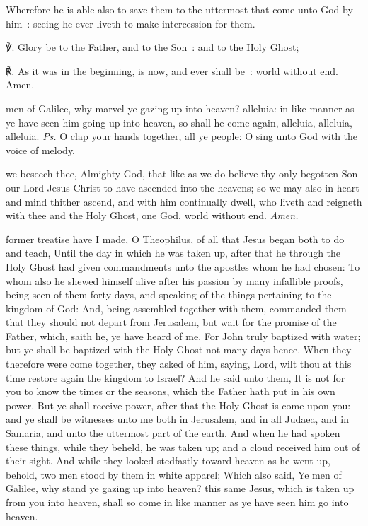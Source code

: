 Wherefore he is able also to save them to the uttermost that come unto God by him~: seeing he ever liveth to make intercession for them.


℣. Glory be to the Father, and to the Son~: and to the Holy Ghost;\par
℟. As it was in the beginning, is now, and ever shall be~: world without end. Amen.


\introit
{} men of Galilee, why marvel ye gazing up into heaven? alleluia: in like manner as ye have seen him going up into heaven, so shall he come again, alleluia, alleluia, alleluia. \textit{Ps.} O clap your hands together, all ye people: O sing unto God with the voice of melody,

\collect\label{AscensionCollect}
 we beseech thee, Almighty God, that like as we do believe thy only-begotten Son our Lord Jesus Christ to have ascended into the heavens; so we may also in heart and mind thither ascend, and with him continually dwell, who liveth and reigneth with thee and the Holy Ghost, one God, world without end. \textit{Amen.}

 former treatise have I made, O Theophilus, of all that Jesus began both to do and teach, Until the day in which he was taken up, after that he through the Holy Ghost had given commandments unto the apostles whom he had chosen: To whom also he shewed himself alive after his passion by many infallible proofs, being seen of them forty days, and speaking of the things pertaining to the kingdom of God: And, being assembled together with them, commanded them that they should not depart from Jerusalem, but wait for the promise of the Father, which, saith he, ye have heard of me. For John truly baptized with water; but ye shall be baptized with the Holy Ghost not many days hence. When they therefore were come together, they asked of him, saying, Lord, wilt thou at this time restore again the kingdom to Israel? And he said unto them, It is not for you to know the times or the seasons, which the Father hath put in his own power. But ye shall receive power, after that the Holy Ghost is come upon you: and ye shall be witnesses unto me both in Jerusalem, and in all Judaea, and in Samaria, and unto the uttermost part of the earth. And when he had spoken these things, while they beheld, he was taken up; and a cloud received him out of their sight. And while they looked stedfastly toward heaven as he went up, behold, two men stood by them in white apparel; Which also said, Ye men of Galilee, why stand ye gazing up into heaven? this same Jesus, which is taken up from you into heaven, shall so come in like manner as ye have seen him go into heaven.

